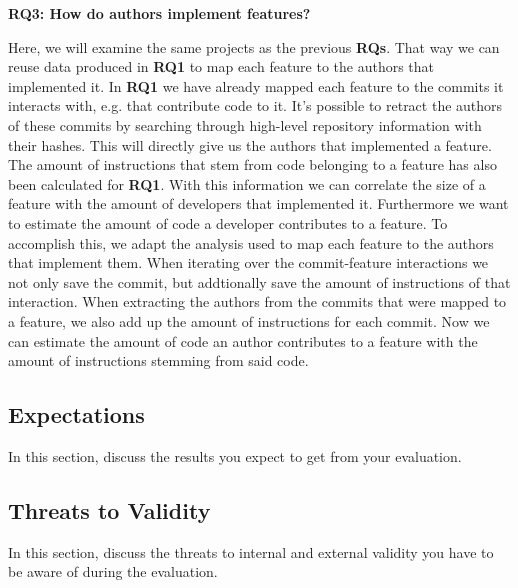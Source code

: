 \textbf{RQ3: How do authors implement features?}

Here, we will examine the same projects as the previous \textbf{RQs}.
That way we can reuse data produced in \textbf{RQ1} to map each feature to the authors that implemented it.
In \textbf{RQ1} we have already mapped each feature to the commits it interacts with, e.g. that contribute code to it.
It's possible to retract the authors of these commits by searching through high-level repository information with their hashes.
This will directly give us the authors that implemented a feature.
The amount of instructions that stem from code belonging to a feature has also been calculated for \textbf{RQ1}.
With this information we can correlate the size of a feature with the amount of developers that implemented it.
Furthermore we want to estimate the amount of code a developer contributes to a feature.
To accomplish this, we adapt the analysis used to map each feature to the authors that implement them.
When iterating over the commit-feature interactions we not only save the commit, but addtionally save the amount of instructions of that interaction.
When extracting the authors from the commits that were mapped to a feature, we also add up the amount of instructions for each commit.
Now we can estimate the amount of code an author contributes to a feature with the amount of instructions stemming from said code.

\subsection*{Expectations}\label{sec:expectations}

In this section, discuss the results you expect to get from your evaluation.

\subsection*{Threats to Validity}\label{sec:threats}

In this section, discuss the threats to internal and external validity you have to be aware of during the evaluation.
